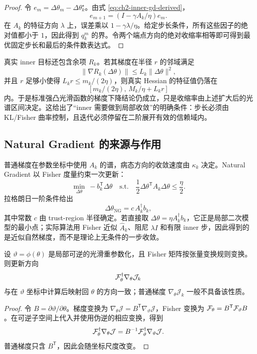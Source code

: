 \begin{proof}
令 $e_m=\Delta\theta_m-\Delta\theta_k^\star$。由式 \eqref{eq:ch2-inner-gd-derived}，
\[
e_{m+1}=(I-\gamma A_k/\eta)e_m.
\]
在 $A_k$ 的特征方向 $\lambda$ 上，误差乘以 $1-\gamma\lambda/\eta$。给定步长条件，所有这些因子的绝对值都小于 $1$，因此得到 $q_k^m$ 的界。令两个端点方向的绝对收缩率相等即可得到最优固定步长和最后的条件数表达式。
\end{proof}

真实 inner 目标还包含余项 $R_k$。若其梯度在半径 $r$ 的邻域满足
\[
\|\nabla R_k(\Delta\theta)\|
\leq L_k\|\Delta\theta\|^2,
\]
并且 $r$ 足够小使得 $L_k r\leq m_k/(2\eta)$，则真实 Hessian 的特征值仍落在
\[
[m_k/(2\eta),\,M_k/\eta+L_kr]
\]
内。于是标准强凸光滑函数的梯度下降结论仍成立，只是收缩率由上述扩大后的光谱区间决定。这给出了“inner 需要做到局部收敛”的明确条件：步长必须由 KL/Fisher 曲率控制，且迭代必须停留在二阶展开有效的信赖域内。

\subsection*{Natural Gradient 的来源与作用}

普通梯度在参数坐标中使用 $A_k$ 的谱，病态方向的收敛速度由 $\kappa_k$ 决定。Natural Gradient 以 Fisher 度量约束一次更新：
\begin{equation}
\label{eq:ch2-natural-gradient-subproblem}
\min_{\Delta\theta}\ 
-b_k^{\mathsf T}\Delta\theta
\quad\text{s.t.}\quad
\frac12\Delta\theta^{\mathsf T}A_k\Delta\theta\leq\frac{\eta}{2}.
\end{equation}
拉格朗日一阶条件给出
\[
\Delta\theta_{\mathrm{NG}}
=
c\,A_k^\dagger b_k,
\]
其中常数 $c$ 由 trust-region 半径确定。若直接取 $\Delta\theta=\eta A_k^\dagger b_k$，它正是局部二次模型的最小点；实际算法用 Fisher 近似 $\widehat A_k$、阻尼 $\lambda I$ 和有限 inner 步，因此得到的是近似自然梯度，而不是理论上无条件的一步收敛。

\begin{proposition}
\label{prop:ch2-ng-invariance}
设 $\vartheta=\phi(\theta)$ 是局部可逆的光滑重参数化，且 Fisher 矩阵按张量变换规则变换。则更新方向
\[
\mathcal{F}_\theta^\dagger\nabla_\theta\mathcal J_k
\]
与在 $\vartheta$ 坐标中计算后映射回 $\theta$ 的方向一致；普通梯度 $\nabla_\theta\mathcal J_k$ 一般不具备该性质。
\end{proposition}

\begin{proof}
令 $B=\partial\vartheta/\partial\theta$。梯度变换为 $\nabla_\theta\mathcal J=B^{\mathsf T}\nabla_\vartheta\mathcal J$，Fisher 变换为 $\mathcal{F}_\theta=B^{\mathsf T}\mathcal{F}_\vartheta B$。在可逆子空间上代入并使用伪逆的相应变换，得到
\[
\mathcal{F}_\theta^\dagger\nabla_\theta\mathcal J
=
B^{-1}\mathcal{F}_\vartheta^\dagger\nabla_\vartheta\mathcal J.
\]
普通梯度只含 $B^{\mathsf T}$，因此会随坐标尺度改变。
\end{proof}

